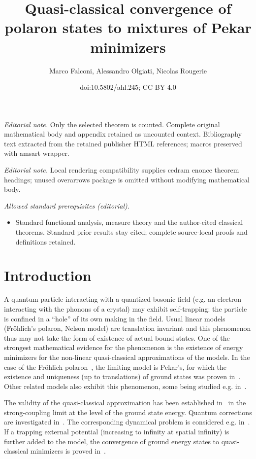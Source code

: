 \documentclass[10pt]{amsart}
\title{Quasi-classical convergence of polaron states to mixtures of Pekar minimizers}
\author{Marco Falconi, Alessandro Olgiati, Nicolas Rougerie}
\date{doi:10.5802/ahl.245; CC BY 4.0}
\theoremstyle{definition}\newtheorem{defi}[theo]{Definition}\newtheorem{rema}[theo]{Remark}\newtheorem{exam}[theo]{Example}\newtheorem{exem}[theo]{Example}\newtheorem{nota}[theo]{Notation}
\newcommand{\1}{\mathds{1}}
\begin{document}
\maketitle
\noindent\textit{Editorial note.} Only the selected theorem is counted. Complete original mathematical body and appendix retained as uncounted context. Bibliography text extracted from the retained publisher HTML references; macros preserved with amsart wrapper.\par\medskip
\noindent\textit{Editorial note.} Local rendering compatibility supplies cedram enonce theorem headings; unused overarrows package is omitted without modifying mathematical body.\par\medskip
\noindent\textit{Allowed standard prerequisites (editorial).}\begin{itemize}
\item Standard functional analysis, measure theory and the author-cited classical theorems. Standard prior results stay cited; complete source-local proofs and definitions retained.
\end{itemize}\medskip


\section{Introduction}

A quantum particle interacting with a quantized bosonic field (e.g. an electron interacting with the phonons of a crystal) may exhibit self-trapping: the particle is confined in a ``hole'' of its own making in the field. Usual linear models (Fr\"ohlich's polaron, Nelson model) are translation invariant and this phenomenon thus may not take the form of existence of actual bound states. One of the strongest mathematical evidence for the phenomenon is the existence of energy minimizers for the non-linear quasi-classical approximations of the models. In the case of the Fr\"ohlich polaron~\cite{Moller-06,Seiringer-19}, the limiting model is Pekar's, for which the existence and uniqueness (up to translations) of ground states was proven in~\cite{Lieb-77,Lions-80}. Other related models also exhibit this phenomenon, some being studied e.g. in~\cite{BreFauPay-22a,BreFauPay-22b,FroJonLen-07b,FroJonLen-07,LewRou-13,LewRou-13b,Ricaud-14}.

The validity of the quasi-classical approximation has been established in~\cite{DonVar-83,LieTho-97,MiySpo-07} in the strong-coupling limit at the level of the ground state energy. Quantum corrections are investigated in~\cite{BroSei-22,FraSei-19,FelSei-21}. The corresponding dynamical problem is considered e.g. in~\cite{CorFalOli-19,FalLeoMitPet-21,
FraGan-17,GriSchSch-17,Griesemer-17,
LeoMitSei-20,
LeoRadSchSei-19}. If a trapping external potential (increasing to infinity at spatial infinity) is further added to the model, the convergence of ground energy states to quasi-classical minimizers is proved in~\cite{CorFalOli-20}.
\end{document}
